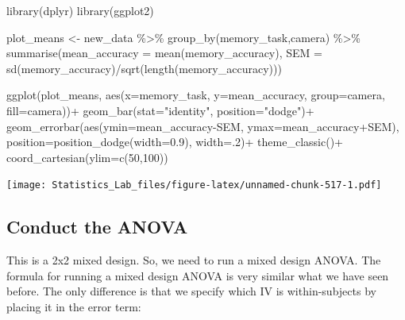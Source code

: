\documentclass[
]{book}
\newenvironment{Shaded}{\begin{snugshade}}{\end{snugshade}}
\newcommand{\AttributeTok}[1]{\textcolor[rgb]{0.77,0.63,0.00}{#1}}
\newcommand{\DecValTok}[1]{\textcolor[rgb]{0.00,0.00,0.81}{#1}}
\newcommand{\FloatTok}[1]{\textcolor[rgb]{0.00,0.00,0.81}{#1}}
\newcommand{\FunctionTok}[1]{\textcolor[rgb]{0.00,0.00,0.00}{#1}}
\newcommand{\NormalTok}[1]{#1}
\newcommand{\OtherTok}[1]{\textcolor[rgb]{0.56,0.35,0.01}{#1}}
\newcommand{\SpecialCharTok}[1]{\textcolor[rgb]{0.00,0.00,0.00}{#1}}
\newcommand{\StringTok}[1]{\textcolor[rgb]{0.31,0.60,0.02}{#1}}
\begin{document}
\begin{Shaded}
\begin{Highlighting}[]
\FunctionTok{library}\NormalTok{(dplyr)}
\FunctionTok{library}\NormalTok{(ggplot2)}

\NormalTok{plot\_means }\OtherTok{\textless{}{-}}\NormalTok{ new\_data }\SpecialCharTok{\%\textgreater{}\%}
            \FunctionTok{group\_by}\NormalTok{(memory\_task,camera) }\SpecialCharTok{\%\textgreater{}\%}
            \FunctionTok{summarise}\NormalTok{(}\AttributeTok{mean\_accuracy =} \FunctionTok{mean}\NormalTok{(memory\_accuracy),}
                      \AttributeTok{SEM =} \FunctionTok{sd}\NormalTok{(memory\_accuracy)}\SpecialCharTok{/}\FunctionTok{sqrt}\NormalTok{(}\FunctionTok{length}\NormalTok{(memory\_accuracy)))}

\FunctionTok{ggplot}\NormalTok{(plot\_means, }\FunctionTok{aes}\NormalTok{(}\AttributeTok{x=}\NormalTok{memory\_task, }\AttributeTok{y=}\NormalTok{mean\_accuracy, }\AttributeTok{group=}\NormalTok{camera, }\AttributeTok{fill=}\NormalTok{camera))}\SpecialCharTok{+}
  \FunctionTok{geom\_bar}\NormalTok{(}\AttributeTok{stat=}\StringTok{"identity"}\NormalTok{, }\AttributeTok{position=}\StringTok{"dodge"}\NormalTok{)}\SpecialCharTok{+}
  \FunctionTok{geom\_errorbar}\NormalTok{(}\FunctionTok{aes}\NormalTok{(}\AttributeTok{ymin=}\NormalTok{mean\_accuracy}\SpecialCharTok{{-}}\NormalTok{SEM, }\AttributeTok{ymax=}\NormalTok{mean\_accuracy}\SpecialCharTok{+}\NormalTok{SEM), }
                \AttributeTok{position=}\FunctionTok{position\_dodge}\NormalTok{(}\AttributeTok{width=}\FloatTok{0.9}\NormalTok{),}
                \AttributeTok{width=}\NormalTok{.}\DecValTok{2}\NormalTok{)}\SpecialCharTok{+}
  \FunctionTok{theme\_classic}\NormalTok{()}\SpecialCharTok{+}
  \FunctionTok{coord\_cartesian}\NormalTok{(}\AttributeTok{ylim=}\FunctionTok{c}\NormalTok{(}\DecValTok{50}\NormalTok{,}\DecValTok{100}\NormalTok{))}
\end{Highlighting}
\end{Shaded}

\texttt{[image: Statistics\_Lab\_files/figure-latex/unnamed-chunk-517-1.pdf]}

\hypertarget{conduct-the-anova-2}{%
\subsection{Conduct the ANOVA}\label{conduct-the-anova-2}}

This is a 2x2 mixed design. So, we need to run a mixed design ANOVA. The formula for running a mixed design ANOVA is very similar what we have seen before. The only difference is that we specify which IV is within-subjects by placing it in the error term:
\end{document}
